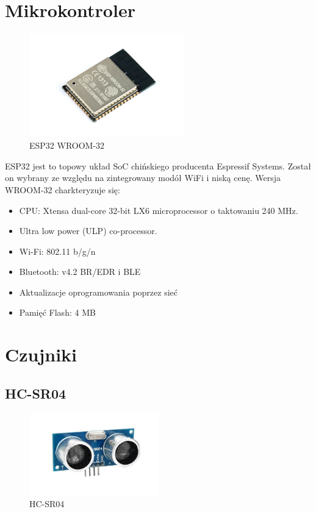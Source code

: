 \documentclass[12pt]{article}
\begin{document}



\tableofcontents

\clearpage

\section{Mikrokontroler}

\begin{figure}[H]
	\centering
	\includegraphics[width=0.6\textwidth]{figures/esp32.jpg}
	\caption{ESP32 WROOM-32}
	\label{fig:mcu}
\end{figure}

ESP32 jest to topowy układ SoC chińskiego producenta Espressif Systems.
Został on wybrany ze względu na zintegrowany modół WiFi i niską cenę.
Wersja WROOM-32 charkteryzuje się:

\begin{itemize}
    \item CPU: Xtensa dual-core 32-bit LX6 microprocessor o taktowaniu 240 MHz.
    \item Ultra low power (ULP) co-processor.
    \item Wi-Fi: 802.11 b/g/n
    \item Bluetooth: v4.2 BR/EDR i BLE
    \item Aktualizacje oprogramowania poprzez sieć
    \item Pamięć Flash: 4 MB
\end{itemize}

\section{Czujniki}
\subsection{HC-SR04}
\begin{figure}[H]
	\centering
	\includegraphics[width=0.5\textwidth]{figures/HC-SR04.jpg}
	\caption{HC-SR04}
	\label{fig:HC-SR04}
\end{figure}
\end{document}
